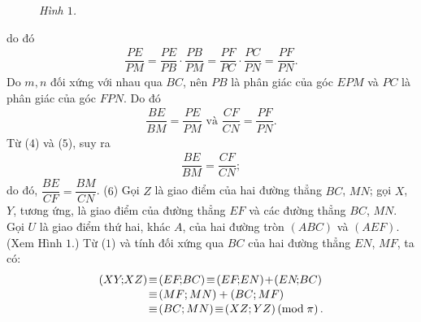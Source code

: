 \begin{multicols}{2}
\begin{figure}[H]
		\caption{\small\textit{\color{thachthuctoanhoc}Hình $1$.}}
		\vspace*{-15pt}
	\end{figure}
	do đó
	\begin{align*}
		\dfrac{{PE}}{{PM}} = \dfrac{{PE}}{{PB}} \cdot \dfrac{{PB}}{{PM}} = \dfrac{{PF}}{{PC}} \cdot \dfrac{{PC}}{{PN}} = \dfrac{{PF}}{{PN}}. \tag{$4$}
	\end{align*}
	Do $m, n$ đối xứng với nhau qua $BC$, nên $PB$ là phân giác của góc $EPM$ và $PC$ là phân giác của góc $FPN$. Do đó
	\begin{align*}
		\dfrac{{BE}}{{BM}} = \dfrac{{PE}}{{PM}} \text{ và } \dfrac{{CF}}{{CN}} = \dfrac{{PF}}{{PN}}. \tag{$5$}
	\end{align*}
	Từ ($4$) và ($5$), suy ra
	\begin{align*}
		\dfrac{{BE}}{{BM}} = \dfrac{{CF}}{{CN}};
	\end{align*}
	do đó, $\dfrac{{BE}}{{CF}} = \dfrac{{BM}}{{CN}}$. \hfill ($6$)
	\vskip 0.05cm
	Gọi $Z$ là giao điểm của hai đường thẳng $BC$, $MN$; gọi $X$, $Y$, tương ứng, là giao điểm của đường thẳng $EF$ và các đường thẳng $BC$, $MN$. Gọi $U$ là giao điểm thứ hai, khác $A$, của hai đường tròn $(ABC)$ và $(AEF)$. (Xem Hình $1$.)
	\vskip 0.05cm
	Từ ($1$) và tính đối xứng qua $BC$ của hai đường thẳng $EN$, $MF$, ta có:
	\begin{align*}
			\left( {XY\!;\!XZ} \right) &\!\equiv \!\left( {EF\!;\!BC} \right) \!\equiv\! \left( {EF\!;\!EN} \right) \!+\! \left( {EN\!;\!BC} \right)\\[-0.5ex]
			&\!\equiv\! \left( {MF;MN} \right) + \left( {BC;MF} \right) \\[-0.5ex]
			&\!\equiv\! \left( {BC;MN} \right) \!\equiv\! \left( {XZ;YZ} \right)\left( {{\rm{mod}}\;\pi } \right).
	\end{align*}

\end{multicols}
